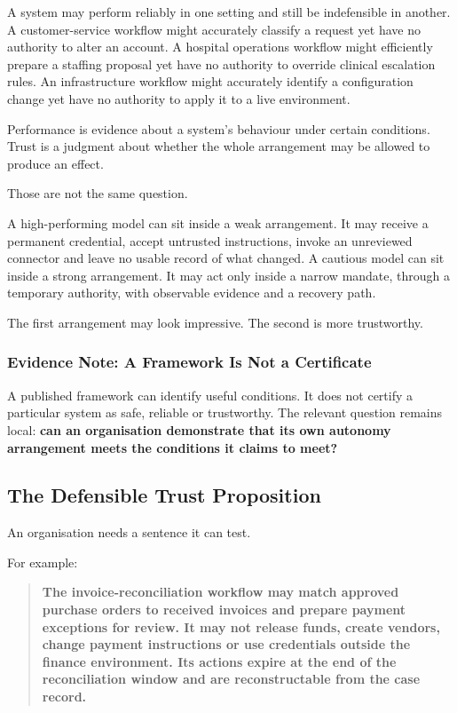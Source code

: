 A system may perform reliably in one setting and still be indefensible
in another. A customer-service workflow might accurately classify a
request yet have no authority to alter an account. A hospital operations
workflow might efficiently prepare a staffing proposal yet have no
authority to override clinical escalation rules. An infrastructure
workflow might accurately identify a configuration change yet have no
authority to apply it to a live environment.

Performance is evidence about a system's behaviour under certain
conditions. Trust is a judgment about whether the whole arrangement may
be allowed to produce an effect.

Those are not the same question.

A high-performing model can sit inside a weak arrangement. It may
receive a permanent credential, accept untrusted instructions, invoke an
unreviewed connector and leave no usable record of what changed. A
cautious model can sit inside a strong arrangement. It may act only
inside a narrow mandate, through a temporary authority, with observable
evidence and a recovery path.

The first arrangement may look impressive. The second is more
trustworthy.

\subsubsection{Evidence Note: A Framework Is Not a
Certificate}\label{evidence-note-a-framework-is-not-a-certificate}

A published framework can identify useful conditions. It does not
certify a particular system as safe, reliable or trustworthy. The
relevant question remains local: \textbf{can an organisation demonstrate
that its own autonomy arrangement meets the conditions it claims to
meet?}

\subsection{The Defensible Trust
Proposition}\label{the-defensible-trust-proposition}

An organisation needs a sentence it can test.

For example:

\begin{quote}
\textbf{The invoice-reconciliation workflow may match approved purchase
orders to received invoices and prepare payment exceptions for review.
It may not release funds, create vendors, change payment instructions or
use credentials outside the finance environment. Its actions expire at
the end of the reconciliation window and are reconstructable from the
case record.}
\end{quote}


